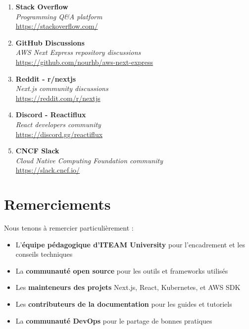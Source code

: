 \begin{enumerate}
    \item \textbf{Stack Overflow} \\
    \textit{Programming Q\&A platform} \\
    \url{https://stackoverflow.com/}

    \item \textbf{GitHub Discussions} \\
    \textit{AWS Next Express repository discussions} \\
    \url{https://github.com/nourhb/aws-next-express}

    \item \textbf{Reddit - r/nextjs} \\
    \textit{Next.js community discussions} \\
    \url{https://reddit.com/r/nextjs}

    \item \textbf{Discord - Reactiflux} \\
    \textit{React developers community} \\
    \url{https://discord.gg/reactiflux}

    \item \textbf{CNCF Slack} \\
    \textit{Cloud Native Computing Foundation community} \\
    \url{https://slack.cncf.io/}
\end{enumerate}

\section{Remerciements}

Nous tenons à remercier particulièrement :

\begin{itemize}
    \item L'\textbf{équipe pédagogique d'ITEAM University} pour l'encadrement et les conseils techniques
    \item La \textbf{communauté open source} pour les outils et frameworks utilisés
    \item Les \textbf{mainteneurs des projets} Next.js, React, Kubernetes, et AWS SDK
    \item Les \textbf{contributeurs de la documentation} pour les guides et tutoriels
    \item La \textbf{communauté DevOps} pour le partage de bonnes pratiques
\end{itemize}

